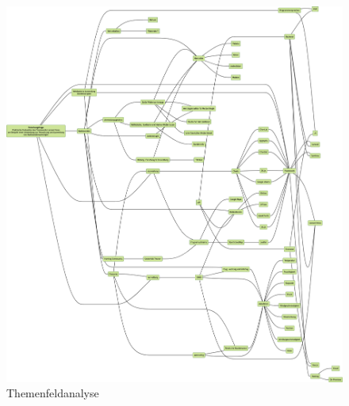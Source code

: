 \begin{figure}[h!]
    \centering
    \caption{Themenfeldanalyse}
    \label{fig:themenfeldanalyse}
    \includegraphics[scale=0.23]{assets/themenfeldanalyse_no_padding}
\end{figure}
